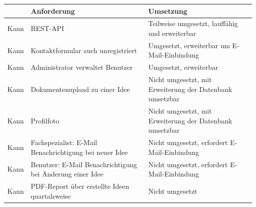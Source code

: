 \begin{center}
    \pagebreak

    \begin{tabularx}{\linewidth}{
        |p{}%
        |p{}%
        |p{}|%
    }
        \hline
        & Anforderung & Umsetzung \\ \hline
        Kann & REST-API & Teilweise umgesetzt, lauffähig und erweiterbar \\ \hline
        Kann & Kontaktformular auch unregistriert & Umgesetzt, erweiterbar um E-Mail-Einbindung \\ \hline
        Kann & Administrator verwaltet Benutzer & Umgesetzt, erweiterbar \\ \hline
        Kann & Dokumentenupload zu einer Idee & Nicht umgesetzt, mit Erweiterung der Datenbank umsetzbar \\ \hline
        Kann & Profilfoto & Nicht umgesetzt, mit Erweiterung der Datenbank umsetzbar \\ \hline
        Kann & Fachspezialist: E-Mail Benachrichtigung bei neuer Idee & Nicht umgesetzt, erfordert E-Mail-Einbindung \\ \hline
        Kann & Benutzer: E-Mail Benachrichtigung bei Änderung einer Idee & Nicht umgesetzt, erfordert E-Mail-Einbindung \\ \hline
        Kann & PDF-Report über erstellte Ideen quartalsweise & Nicht umgesetzt \\ \hline
    \end{tabularx}
\end{center}

